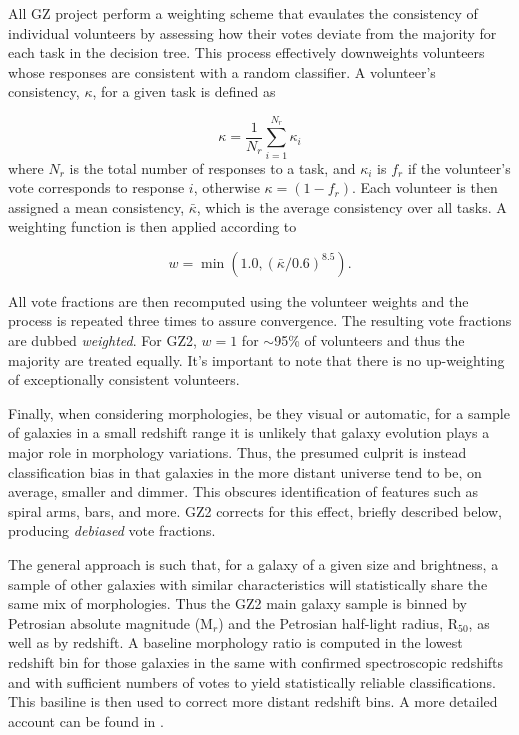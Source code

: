 All GZ project perform a weighting scheme that evaulates the consistency of individual volunteers by assessing how their votes deviate from the majority for each task in the decision tree. This process effectively downweights volunteers whose responses are consistent with a random classifier. A volunteer's consistency, $\kappa$, for a given task is defined as 

\begin{equation}
\kappa = \frac{1}{N_r}\sum_{i=1}^{N_r}{\kappa_i}
\end{equation}
where $N_r$ is the total number of responses to a task, and $\kappa_i$ is $f_r$ if the volunteer's vote corresponds to response $i$, otherwise $\kappa=(1-f_r)$. Each volunteer is then assigned a mean consistency, $\bar\kappa$, which is the average consistency over all tasks. A weighting function is then applied according to  

\begin{equation}
w = \min({1.0, (\bar\kappa/0.6)^{8.5}}).
\end{equation}

All vote fractions are then recomputed using the volunteer weights and the process is repeated three times to assure convergence. The resulting vote fractions are dubbed \textit{weighted}. For GZ2, $w=1$ for $\sim$95\% of volunteers and thus the majority are treated equally. It's important to note that there is no up-weighting of exceptionally consistent volunteers.


Finally, when considering morphologies, be they visual or automatic, for a sample of galaxies in a small redshift range it is unlikely that galaxy evolution plays a major role in morphology variations. Thus, the presumed culprit is instead classification bias in that galaxies in the more distant universe tend to be, on average, smaller and dimmer. This obscures identification of features such as spiral arms, bars, and more. GZ2 corrects for this effect, briefly described below, producing \textit{debiased} vote fractions.

The general approach is such that, for a galaxy of a given size and brightness, a sample of other galaxies with similar characteristics will statistically share the same mix of morphologies. Thus the GZ2 main galaxy sample is binned by Petrosian absolute magnitude (M$_r$) and the Petrosian half-light radius, R$_{50}$,  as well as by redshift. A baseline morphology ratio is computed in the lowest redshift bin for those galaxies in the same with confirmed spectroscopic redshifts and with sufficient numbers of votes to yield statistically reliable classifications. This basiline is then used to correct more distant redshift bins. A more detailed account can be found in \cite{Willett2013}.

